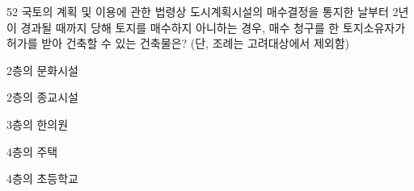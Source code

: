 \begin{question}{52}
국토의 계획 및 이용에 관한 법령상 도시계획시설의 매수결정을 통지한 날부터 2년이 경과될 때까지 당해 토지를 매수하지 아니하는 경우, 매수 청구를 한 토지소유자가 허가를 받아 건축할 수 있는 건축물은? (단, 조례는 고려대상에서 제외함)
\begin{choices}
  \item 2층의 문화시설
  \item 2층의 종교시설
  \item 3층의 한의원
  \item 4층의 주택
  \item 4층의 초등학교
\end{choices}
\end{question}

